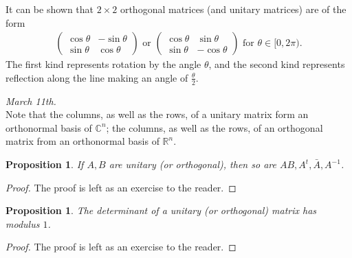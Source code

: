 \documentclass[15pt,a4paper]{book}
\newtheorem{proposition}[theorem]{Proposition}
\theoremstyle{definition}
\newcommand{\R}{\mathbb{R}}
\newcommand{\C}{\mathbb{C}}
\begin{document}
It can be shown that $2 \times 2$ orthogonal matrices (and unitary matrices) are of the form
\begin{align}
    \begin{pmatrix}
        \cos \theta & -\sin \theta \\ \sin \theta & \cos \theta
    \end{pmatrix} \text{ or }
    \begin{pmatrix}
        \cos \theta & \sin \theta \\ \sin \theta & -\cos \theta
    \end{pmatrix} \text{ for } \theta \in [0,2\pi).
\end{align}
The first kind represents rotation by the angle $\theta$, and the second kind represents reflection along the line making an angle of $\frac{\theta}{2}$.

\textit{March 11th.}\\
Note that the columns, as well as the rows, of a unitary matrix form an orthonormal basis of $\C^{n}$; the columns, as well as the rows, of an orthogonal matrix from an orthonormal basis of $\R^{n}$.

\begin{proposition}
    If $A,B$ are unitary (or orthogonal), then so are $AB,A^{t},\bar{A},A^{-1}$.
\end{proposition}
\begin{proof}
    The proof is left as an exercise to the reader.
\end{proof}

\begin{proposition}
    The determinant of a unitary (or orthogonal) matrix has modulus $1$.
\end{proposition}
\begin{proof}
    The proof is left as an exercise to the reader.
\end{proof}
\end{document}
